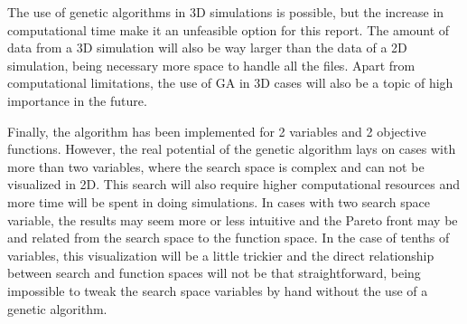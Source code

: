 The use of genetic algorithms in 3D simulations is possible, but the increase in computational time make it an unfeasible option for this report. The amount of data from a 3D simulation will also be way larger than the data of a 2D simulation, being necessary more space to handle all the files. Apart from computational limitations, the use of GA in 3D cases will also be a topic of high importance in the future.

Finally, the algorithm has been implemented for 2 variables and 2 objective functions. However, the real potential of the genetic algorithm lays on cases with more than two variables, where the search space is complex and can not be visualized in 2D. This search will also require higher computational resources and more time will be spent in doing simulations. In cases with two search space variable, the results may seem more or less intuitive and the Pareto front may be  and related from the search space to the function space. In the case of tenths of variables, this visualization will be a little trickier and the direct relationship between search and function spaces will not be that straightforward, being impossible to tweak the search space variables by hand without the use of a genetic algorithm. 